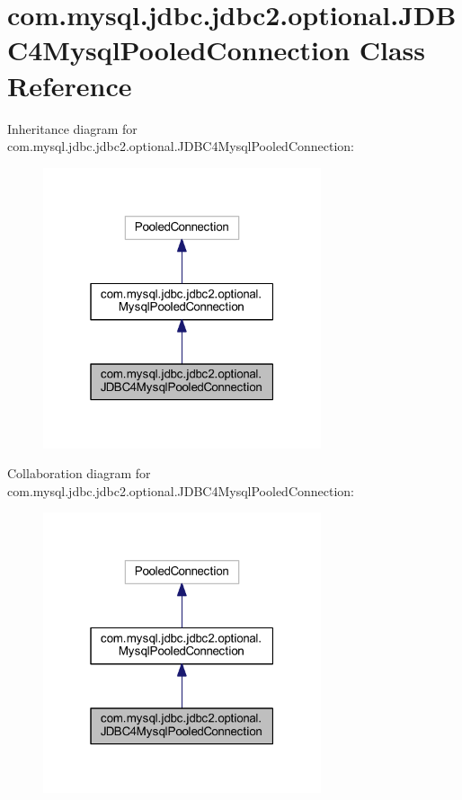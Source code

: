 \hypertarget{classcom_1_1mysql_1_1jdbc_1_1jdbc2_1_1optional_1_1_j_d_b_c4_mysql_pooled_connection}{}\section{com.\+mysql.\+jdbc.\+jdbc2.\+optional.\+J\+D\+B\+C4\+Mysql\+Pooled\+Connection Class Reference}
\label{classcom_1_1mysql_1_1jdbc_1_1jdbc2_1_1optional_1_1_j_d_b_c4_mysql_pooled_connection}


Inheritance diagram for com.\+mysql.\+jdbc.\+jdbc2.\+optional.\+J\+D\+B\+C4\+Mysql\+Pooled\+Connection\+:
\nopagebreak
\begin{figure}[H]
\begin{center}
\leavevmode
\includegraphics[width=232pt]{classcom_1_1mysql_1_1jdbc_1_1jdbc2_1_1optional_1_1_j_d_b_c4_mysql_pooled_connection__inherit__graph}
\end{center}
\end{figure}


Collaboration diagram for com.\+mysql.\+jdbc.\+jdbc2.\+optional.\+J\+D\+B\+C4\+Mysql\+Pooled\+Connection\+:
\nopagebreak
\begin{figure}[H]
\begin{center}
\leavevmode
\includegraphics[width=232pt]{classcom_1_1mysql_1_1jdbc_1_1jdbc2_1_1optional_1_1_j_d_b_c4_mysql_pooled_connection__coll__graph}
\end{center}
\end{figure}
